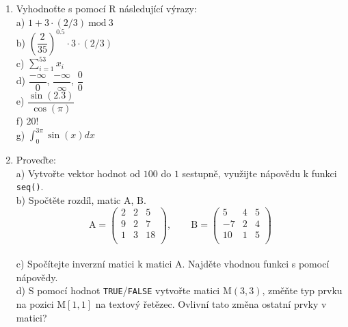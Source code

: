 \documentclass[
  letterpaper,
  DIV=11,
  numbers=noendperiod]{scrreprt}
\begin{document}
\begin{tcolorbox}[enhanced jigsaw, toprule=.15mm, breakable, title=\textcolor{quarto-callout-tip-color}{\faLightbulb}\hspace{0.5em}{Cvičení}, colframe=quarto-callout-tip-color-frame, bottomrule=.15mm, left=2mm, leftrule=.75mm, colbacktitle=quarto-callout-tip-color!10!white, colback=white, bottomtitle=1mm, toptitle=1mm, opacityback=0, opacitybacktitle=0.6, arc=.35mm, coltitle=black, rightrule=.15mm, titlerule=0mm]

\begin{enumerate}
\def\labelenumi{\arabic{enumi}.}
\item
  Vyhodnoťte s pomocí R následující výrazy:\\
  a) \(1 + 3 \cdot (2 / 3)\:\mathrm{mod}\:3\)\\
  b) \(\left(\dfrac{2}{35}\right)^{0.5} \cdot 3 \cdot (2 / 3)\)\\
  c) \(\sum\limits_{i = 1}^{53}x_i\)\\
  d) \(\dfrac{-\infty}{0}\), \(\dfrac{-\infty}{\infty}\),
  \(\dfrac{0}{0}\)\\
  e) \(\dfrac{\sin(2.3)}{\cos(\pi)}\)\\
  f) \(20!\)\\
  g) \(\int_{0}^{3\pi} \sin(x) dx\)
\item
  Proveďte:\\
  a) Vytvořte vektor hodnot od \(100\) do \(1\) sestupně, využijte
  nápovědu k funkci \texttt{seq()}.\\
  b) Spočtěte rozdíl, matic \(\boldsymbol{\mathrm{A}}\),
  \(\boldsymbol{\mathrm{B}}\). \[\boldsymbol{\mathrm{A}} = \left(
    \begin{matrix}
    2 & 2 & 5\\
    9 & 2 & 7\\
    1 & 3 & 18\\
    \end{matrix}
    \right),\qquad 
    \boldsymbol{\mathrm{B}} = \left(
    \begin{matrix}
    5 & 4 & 5\\
    -7 & 2 & 4\\
    10 & 1 & 5\\
    \end{matrix}
    \right)
    \]\\
  c) Spočítejte inverzní matici k matici \(\boldsymbol{\mathrm{A}}\).
  Najděte vhodnou funkci s pomocí nápovědy.\\
  d) S pomocí hodnot \texttt{TRUE}/\texttt{FALSE} vytvořte matici
  \(\boldsymbol{\mathrm{M}}(3,3)\), změňte typ prvku na pozici
  \(\boldsymbol{\mathrm{M}}[1, 1]\) na textový řetězec. Ovlivní tato
  změna ostatní prvky v matici?
\end{enumerate}

\end{tcolorbox}
\end{document}
